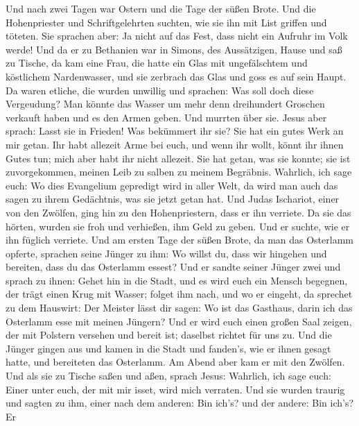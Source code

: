  Und nach zwei Tagen war Ostern und die Tage der süßen
Brote. Und die Hohenpriester und Schriftgelehrten suchten, wie sie ihn
mit List griffen und töteten.  Sie sprachen aber: Ja nicht
auf das Fest, dass nicht ein Aufruhr im Volk werde!  Und
da er zu Bethanien war in Simons, des Aussätzigen, Hause und saß zu
Tische, da kam eine Frau, die hatte ein Glas mit ungefälschtem und
köstlichem Nardenwasser, und sie zerbrach das Glas und goss es auf sein
Haupt.  Da waren etliche, die wurden unwillig und
sprachen: Was soll doch diese Vergeudung?  Man könnte das
Wasser um mehr denn dreihundert Groschen verkauft haben und es den Armen
geben. Und murrten über sie.  Jesus aber sprach: Lasst sie
in Frieden! Was bekümmert ihr sie? Sie hat ein gutes Werk an mir getan.
 Ihr habt allezeit Arme bei euch, und wenn ihr wollt,
könnt ihr ihnen Gutes tun; mich aber habt ihr nicht allezeit.
 Sie hat getan, was sie konnte; sie ist zuvorgekommen,
meinen Leib zu salben zu meinem Begräbnis.  Wahrlich, ich
sage euch: Wo dies Evangelium gepredigt wird in aller Welt, da wird man
auch das sagen zu ihrem Gedächtnis, was sie jetzt getan hat.
 Und Judas Ischariot, einer von den Zwölfen, ging hin zu
den Hohenpriestern, dass er ihn verriete.  Da sie das
hörten, wurden sie froh und verhießen, ihm Geld zu geben. Und er suchte,
wie er ihn füglich verriete.  Und am ersten Tage der
süßen Brote, da man das Osterlamm opferte, sprachen seine Jünger zu ihm:
Wo willst du, dass wir hingehen und bereiten, dass du das Osterlamm
essest?  Und er sandte seiner Jünger zwei und sprach zu
ihnen: Gehet hin in die Stadt, und es wird euch ein Mensch begegnen, der
trägt einen Krug mit Wasser; folget ihm nach,  und wo er
eingeht, da sprechet zu dem Hauswirt: Der Meister lässt dir sagen: Wo
ist das Gasthaus, darin ich das Osterlamm esse mit meinen Jüngern?
 Und er wird euch einen großen Saal zeigen, der mit
Polstern versehen und bereit ist; daselbst richtet für uns zu.
 Und die Jünger gingen aus und kamen in die Stadt und
fanden's, wie er ihnen gesagt hatte, und bereiteten das Osterlamm.
 Am Abend aber kam er mit den Zwölfen. 
Und als sie zu Tische saßen und aßen, sprach Jesus: Wahrlich, ich sage
euch: Einer unter euch, der mit mir isset, wird mich verraten.
 Und sie wurden traurig und sagten zu ihm, einer nach dem
anderen: Bin ich's? und der andere: Bin ich's?  Er

